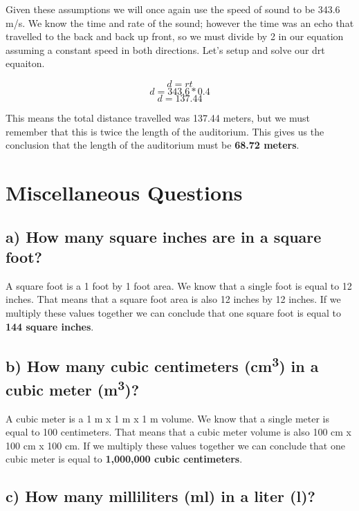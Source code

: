\documentclass[]{article}
\begin{document}
Given these assumptions we will once again use the speed of sound to be
343.6 m/s. We know the time and rate of the sound; however the time was
an echo that travelled to the back and back up front, so we must divide
by 2 in our equation assuming a constant speed in both directions. Let's
setup and solve our drt equaiton.

\[d = rt\] \[d = 343.6 * 0.4\] \[d = 137.44\]

This means the total distance travelled was 137.44 meters, but we must
remember that this is twice the length of the auditorium. This gives us
the conclusion that the length of the auditorium must be \textbf{68.72
meters}.

\section{Miscellaneous Questions}\label{miscellaneous-questions}

\subsection{a) How many square inches are in a square
foot?}\label{a-how-many-square-inches-are-in-a-square-foot}

A square foot is a 1 foot by 1 foot area. We know that a single foot is
equal to 12 inches. That means that a square foot area is also 12 inches
by 12 inches. If we multiply these values together we can conclude that
one square foot is equal to \textbf{144 square inches}.

\subsection{\texorpdfstring{b) How many cubic centimeters
(cm\textsuperscript{3}) in a cubic meter
(m\textsuperscript{3})?}{b) How many cubic centimeters (cm3) in a cubic meter (m3)?}}\label{b-how-many-cubic-centimeters-cm3-in-a-cubic-meter-m3}

A cubic meter is a 1 m x 1 m x 1 m volume. We know that a single meter
is equal to 100 centimeters. That means that a cubic meter volume is
also 100 cm x 100 cm x 100 cm. If we multiply these values together we
can conclude that one cubic meter is equal to \textbf{1,000,000 cubic
centimeters}.

\subsection{c) How many milliliters (ml) in a liter
(l)?}\label{c-how-many-milliliters-ml-in-a-liter-l}
\end{document}
